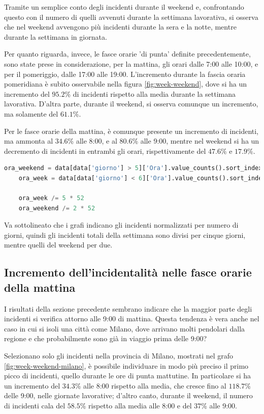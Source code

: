 \documentclass[a4paper]{report}
\begin{document}
Tramite un semplice conto degli incidenti durante il weekend e, 
confrontando questo con il numero di quelli avvenuti durante la 
settimana lavorativa, si osserva che nel weekend avvengono più incidenti 
durante la sera e la notte, mentre durante la settimana in giornata.

Per quanto riguarda, invece, le fasce orarie 'di punta' definite precedentemente, 
sono state prese in considerazione, per la mattina, gli orari dalle 7:00 alle 10:00, 
e per il pomeriggio, dalle 17:00 alle 19:00.
L'incremento durante la fascia oraria pomeridiana è subito osservabile nella figura 
\ref{fig:week-weekend}, dove si ha un incremento del $95.2$\% di incidenti rispetto 
alla media durante la settimana lavorativa. 
D'altra parte, durante il weekend, si osserva comunque un incremento, ma solamente del $61.1$\%.

Per le fasce orarie della mattina, è comunque presente un incremento di incidenti, ma 
ammonta al $34.6$\% alle 8:00, e al $80.6$\% alle 9:00, mentre nel weekend si ha un 
decremento di incidenti in entrambi gli orari, rispettivamente del $47.6$\% e $17.9$\%.

\begin{lstlisting}[language=Python]
    ora_weekend = data[data['giorno'] > 5]['Ora'].value_counts().sort_index()
    ora_week = data[data['giorno'] < 6]['Ora'].value_counts().sort_index()

    ora_week /= 5 * 52
    ora_weekend /= 2 * 52
\end{lstlisting}

Va sottolineato che i grafi indicano gli incidenti normalizzati per numero di 
giorni, quindi gli incidenti totali della settimana sono divisi per cinque giorni, 
mentre quelli del weekend per due.

\subsection{Incremento dell'incidentalità nelle fasce orarie della mattina}

I risultati della sezione precedente sembrano indicare che la maggior parte degli incidenti 
si verifica attorno alle 9:00 di mattina. Questa tendenza è vera anche nel caso in cui si 
isoli una città come Milano, dove arrivano molti pendolari dalla regione e che probabilmente sono 
già in viaggio prima delle 9:00?

Selezionano solo gli incidenti nella provincia di Milano, mostrati nel grafo 
\ref{fig:week-weekend-milano}, è possibile individuare in modo più preciso
il primo picco di incidenti, quello durante le ore di punta mattutine.
In particolare si ha un incremento del $34.3$\% alle 8:00 rispetto alla media, 
che cresce fino al $118.7$\% delle 9:00, nelle giornate lavorative;
d'altro canto, durante il weekend, il numero di incidenti cala del $58.5$\% rispetto alla media alle 8:00 
e del $37$\% alle 9:00.
\end{document}
